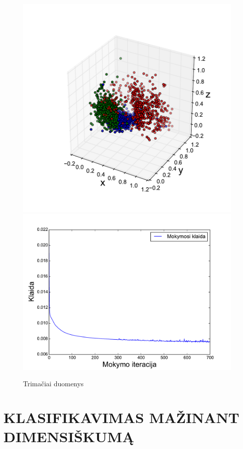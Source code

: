 \documentclass{VUMIFPSbakalaurinis}
\begin{document}
\begin{figure}[h]
	\includegraphics[scale=0.45]{pics/points_3d}
	\includegraphics[scale=0.45]{pics/points_3d_progress}
	\caption{Trimačiai duomenys}
	\label{fig:3d_points}
\end{figure}



\clearpage
\section{KLASIFIKAVIMAS MAŽINANT DIMENSIŠKUMĄ} \label{classification-dimensionality-reduction}
\end{document}
